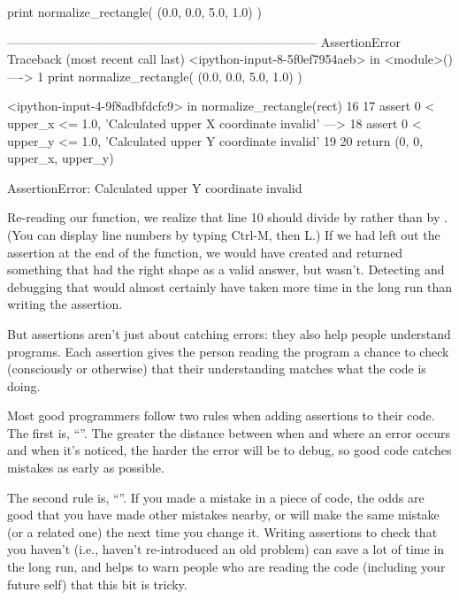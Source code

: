 \begin{VerbIn}
print normalize_rectangle( (0.0, 0.0, 5.0, 1.0) )
\end{VerbIn}

\begin{VerbErr}
---------------------------------------------------------------------------
AssertionError                            Traceback (most recent call last)
<ipython-input-8-5f0ef7954aeb> in <module>()
----> 1 print normalize_rectangle( (0.0, 0.0, 5.0, 1.0) )

<ipython-input-4-9f8adbfdcfc9> in normalize_rectangle(rect)
     16
     17     assert 0 < upper_x <= 1.0, 'Calculated upper X coordinate invalid'
---> 18     assert 0 < upper_y <= 1.0, 'Calculated upper Y coordinate invalid'
     19
     20     return (0, 0, upper_x, upper_y)

AssertionError: Calculated upper Y coordinate invalid
\end{VerbErr}

Re-reading our function, we realize that line 10 should divide
 by  rather than  by . (You
can display line numbers by typing Ctrl-M, then L.) If we had left out
the assertion at the end of the function, we would have created and
returned something that had the right shape as a valid answer, but
wasn't. Detecting and debugging that would almost certainly have taken
more time in the long run than writing the assertion.

But assertions aren't just about catching errors: they also help people
understand programs. Each assertion gives the person reading the program
a chance to check (consciously or otherwise) that their understanding
matches what the code is doing.

Most good programmers follow two rules when adding assertions to their
code. The first is, ``''. The greater the distance between when and where an
error occurs and when it's noticed, the harder the error will be to
debug, so good code catches mistakes as early as possible.

The second rule is,
``''. If you made a mistake in a piece of code,
the odds are good that you have made other mistakes nearby, or will make
the same mistake (or a related one) the next time you change it. Writing
assertions to check that you haven't 
(i.e., haven't re-introduced an old problem) can save a lot of time in
the long run, and helps to warn people who are reading the code
(including your future self) that this bit is tricky.

